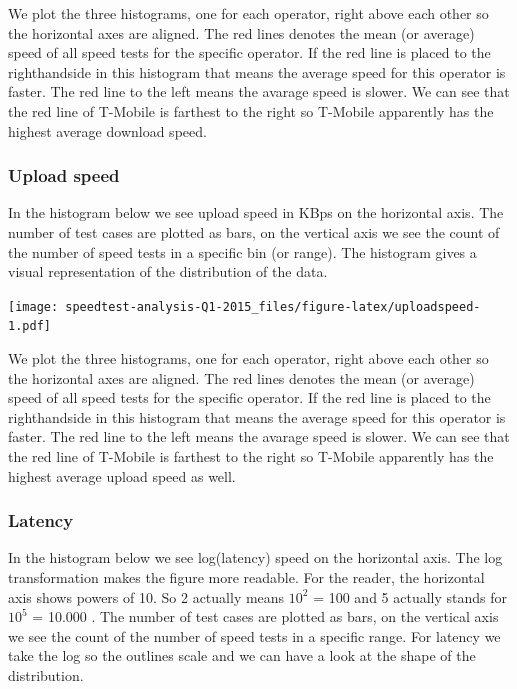 \documentclass[]{article}
\begin{document}
We plot the three histograms, one for each operator, right above each
other so the horizontal axes are aligned. The red lines denotes the mean
(or average) speed of all speed tests for the specific operator. If the
red line is placed to the righthandside in this histogram that means the
average speed for this operator is faster. The red line to the left
means the avarage speed is slower. We can see that the red line of
T-Mobile is farthest to the right so T-Mobile apparently has the highest
average download speed.

\subsubsection{Upload speed}\label{upload-speed}

In the histogram below we see upload speed in KBps on the horizontal
axis. The number of test cases are plotted as bars, on the vertical axis
we see the count of the number of speed tests in a specific bin (or
range). The histogram gives a visual representation of the distribution
of the data.

\texttt{[image: speedtest-analysis-Q1-2015\_files/figure-latex/uploadspeed-1.pdf]}

We plot the three histograms, one for each operator, right above each
other so the horizontal axes are aligned. The red lines denotes the mean
(or average) speed of all speed tests for the specific operator. If the
red line is placed to the righthandside in this histogram that means the
average speed for this operator is faster. The red line to the left
means the avarage speed is slower. We can see that the red line of
T-Mobile is farthest to the right so T-Mobile apparently has the highest
average upload speed as well.

\subsubsection{Latency}\label{latency}

In the histogram below we see log(latency) speed on the horizontal axis.
The log transformation makes the figure more readable. For the reader,
the horizontal axis shows powers of 10. So 2 actually means $10^{2}$ =
100 and 5 actually stands for $10^{5}$ = 10.000 . The number of test
cases are plotted as bars, on the vertical axis we see the count of the
number of speed tests in a specific range. For latency we take the log
so the outlines scale and we can have a look at the shape of the
distribution.
\end{document}
